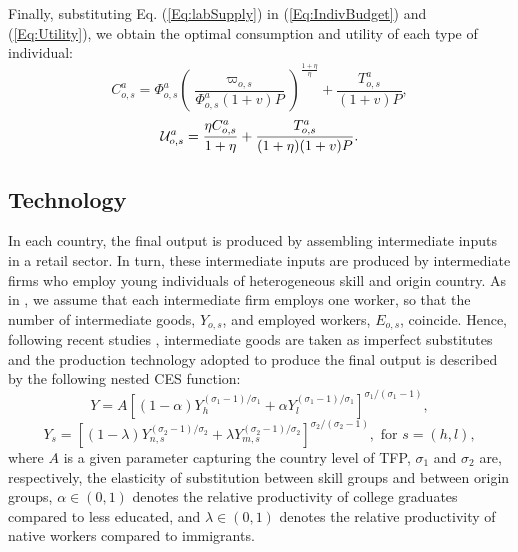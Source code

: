 \documentclass[a4paper,12pt]{article}
\begin{document}
Finally, substituting Eq. (\ref{Eq:labSupply}) in (\ref{Eq:IndivBudget}) and
(\ref{Eq:Utility}), we obtain the optimal consumption and utility of each
type of individual: 
\begin{equation}
C_{o,s}^{a}=\Phi _{o,s}^{a}\left( \frac{\varpi _{o,s}}{\Phi _{o,s}^{a}(1+v)P}%
\right) ^{\frac{1+\eta }{\eta }}+\frac{T_{o,s}^{a}}{(1+v)P},
\label{Eq:OptCons}
\end{equation}%
\begin{equation}
\mathcal{U}_{o,s}^{a}=\frac{\eta C_{o,s}^{a}}{1+\eta }+\frac{T_{o,s}^{a}}{%
(1+\eta )(1+v)P}.  \label{Eq:OptU}
\end{equation}

\subsection{Technology} \label{technology}

In each country, the final output is produced by assembling intermediate
inputs in a retail sector. In turn, these intermediate inputs are produced
by intermediate firms who employ young individuals of heterogeneous skill
and origin country. As in \citet{Acemoglu2001}, we assume that each intermediate firm employs one worker, so that the number of intermediate goods, $Y_{o,s}$, and employed workers, $E_{o,s}$, coincide. Hence, following recent studies \citep[such as][]{Manacorda2012,Ottaviano2012}, intermediate goods are taken as imperfect substitutes and the production
technology adopted to produce the final output is described by the
following nested CES function: 
\begin{equation}
Y=A\left[ (1-\alpha )Y_{h}^{(\sigma _{1}-1)/\sigma _{1}}+\alpha
Y_{l}^{(\sigma _{1}-1)/\sigma _{1}}\right] ^{\sigma _{1}/\left(\sigma _{1}-1\right)},
\label{Eq:ProdFunction}
\end{equation}%
\begin{equation*}
Y_{s}=\left[ (1-\lambda )Y_{n,s}^{(\sigma _{2}-1)/\sigma _{2}}+\lambda
Y_{m,s}^{(\sigma _{2}-1)/\sigma _{2}}\right] ^{\sigma _{2}/(\sigma _{2}-1)},%
\text{ for $s=(h,l)$},
\end{equation*}%
where $A$ is a given parameter capturing the country level of TFP, $\sigma
_{1}$ and $\sigma _{2}$ are, respectively, the elasticity of substitution
between skill groups and between origin groups, $\alpha \in (0,1)$ denotes
the relative productivity of college graduates compared to less educated,
and $\lambda \in (0,1)$ denotes the relative productivity of native workers
compared to immigrants.
\end{document}
